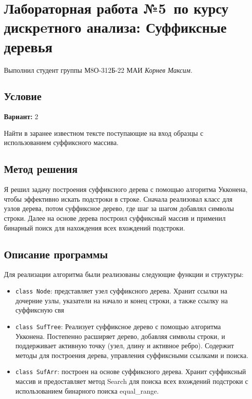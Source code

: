 \documentclass[12pt]{article}
\begin{document}
\section*{Лабораторная работа №5\, по курсу дискрeтного анализа: Суффиксные деревья}

Выполнил студент группы М8О-312Б-22 МАИ \textit{Корнев Максим}.

\subsection*{Условие}

\textbf{Вариант:} 2

Найти в заранее известном тексте поступающие на вход образцы с использованием суффиксного массива.

\newpage
\subsection*{Метод решения}

Я решил задачу построения суффиксного дерева с помощью алгоритма Укконена, чтобы эффективно искать подстроки в строке. Сначала реализовал класс для узлов дерева, потом суффиксное дерево, где шаг за шагом добавлял символы строки. Далее на основе дерева построил суффиксный массив и применил бинарный поиск для нахождения всех вхождений подстроки.

\subsection*{Описание программы}

Для реализации алгоритма были реализованы следующие функции и структуры:
\begin{itemize}
    \item \texttt{class Node}: представляет узел суффиксного дерева. Хранит ссылки на дочерние узлы, указатели на начало и конец строки, а также ссылку на суффиксную свя
    \item \texttt{class SufTree}: Реализует суффиксное дерево с помощью алгоритма Укконена. Постепенно расширяет дерево, добавляя символы строки, и поддерживает активную точку (узел, длину и активное ребро). Содержит методы для построения дерева, управления суффиксными ссылками и поиска.
    \item \texttt{class SufArr}: построен на основе суффиксного дерева. Хранит суффиксный массив и предоставляет метод Search для поиска всех вхождений подстроки с использованием бинарного поиска {equal\_range}.
\end{itemize}
\end{document}
